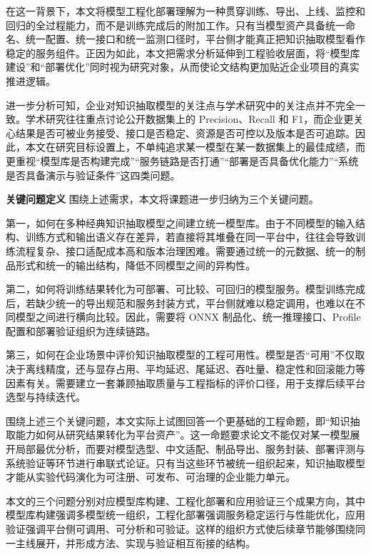 在这一背景下，本文将模型工程化部署理解为一种贯穿训练、导出、上线、监控和回归的全过程能力，而不是训练完成后的附加工作。只有当模型资产具备统一命名、统一配置、统一接口和统一监测口径时，平台侧才能真正把知识抽取模型看作稳定的服务组件。正因为如此，本文把需求分析延伸到工程验收层面，将“模型库建设”和“部署优化”同时视为研究对象，从而使论文结构更加贴近企业项目的真实推进逻辑。

进一步分析可知，企业对知识抽取模型的关注点与学术研究中的关注点并不完全一致。学术研究往往重点讨论公开数据集上的 Precision、Recall 和 F1，而企业更关心结果是否可被业务接受、接口是否稳定、资源是否可控以及版本是否可追踪。因此，本文在研究目标设置上，不单纯追求某一模型在某一数据集上的最佳成绩，而更重视“模型库是否构建完成”“服务链路是否打通”“部署是否具备优化能力”“系统是否具备演示与验证条件”这四类问题。

\par\textbf{关键问题定义}
围绕上述需求，本文将课题进一步归纳为三个关键问题。

第一，如何在多种经典知识抽取模型之间建立统一模型库。由于不同模型的输入结构、训练方式和输出语义存在差异，若直接将其堆叠在同一平台中，往往会导致训练流程复杂、接口适配成本高和版本治理困难。需要通过统一的元数据、统一的制品形式和统一的输出结构，降低不同模型之间的异构性。

第二，如何将训练结果转化为可部署、可比较、可回归的模型服务。模型训练完成后，若缺少统一的导出规范和服务封装方式，平台侧就难以稳定调用，也难以在不同模型之间进行横向比较。因此，需要将 ONNX 制品化、统一推理接口、Profile 配置和部署验证组织为连续链路。

第三，如何在企业场景中评价知识抽取模型的工程可用性。模型是否“可用”不仅取决于离线精度，还与显存占用、平均延迟、尾延迟、吞吐量、稳定性和回滚能力等因素有关。需要建立一套兼顾抽取质量与工程指标的评价口径，用于支撑后续平台选型与持续迭代。

\par
围绕上述三个关键问题，本文实际上试图回答一个更基础的工程命题，即“知识抽取能力如何从研究结果转化为平台资产”。这一命题要求论文不能仅对某一模型展开局部最优分析，而要对模型选型、中文适配、制品导出、服务封装、部署评测与系统验证等环节进行串联式论证。只有当这些环节被统一组织起来，知识抽取模型才能从实验代码演化为可注册、可发布、可治理的企业能力单元。
\par
本文的三个问题分别对应模型库构建、工程化部署和应用验证三个成果方向，其中模型库构建强调多模型统一组织，工程化部署强调服务稳定运行与性能优化，应用验证强调平台侧可调用、可分析和可验证。这样的组织方式使后续章节能够围绕同一主线展开，并形成方法、实现与验证相互衔接的结构。

